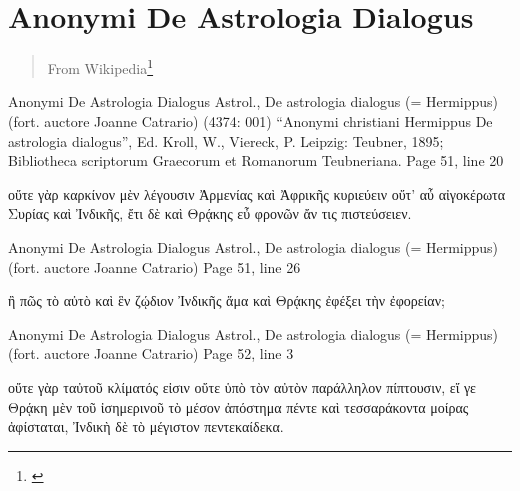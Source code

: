 \documentclass[12pt,letterpaper,twoside,final]{memoir}
\begin{document}
\section{Anonymi De Astrologia Dialogus}%
\blockquote[From Wikipedia\footnote{\url{}}]{}
\begin{greek}

Anonymi De Astrologia Dialogus Astrol., De astrologia dialogus (= Hermippus) (fort. auctore Joanne Catrario) (4374: 001)
“Anonymi christiani Hermippus De astrologia dialogus”, Ed. Kroll, W., Viereck, P.
Leipzig: Teubner, 1895; Bibliotheca scriptorum Graecorum et Romanorum Teubneriana.
Page 51, line 20

                                   οὔτε γὰρ καρκίνον μὲν 
λέγουσιν Ἀρμενίας καὶ Ἀφρικῆς κυριεύειν οὔτ' αὖ 
αἰγοκέρωτα Συρίας καὶ Ἰνδικῆς, ἔτι δὲ καὶ Θρᾴκης 
εὖ φρονῶν ἄν τις πιστεύσειεν. 



Anonymi De Astrologia Dialogus Astrol., De astrologia dialogus (= Hermippus) (fort. auctore Joanne Catrario) 
Page 51, line 26

                                                       ἢ πῶς 
τὸ αὐτὸ καὶ ἓν ζῴδιον Ἰνδικῆς ἅμα καὶ Θρᾴκης ἐφέξει 
τὴν ἐφορείαν; 



Anonymi De Astrologia Dialogus Astrol., De astrologia dialogus (= Hermippus) (fort. auctore Joanne Catrario) 
Page 52, line 3

                 οὔτε γὰρ ταὐτοῦ κλίματός εἰσιν οὔτε   
ὑπὸ τὸν αὐτὸν παράλληλον πίπτουσιν, εἴ γε Θρᾴκη 
μὲν τοῦ ἰσημερινοῦ τὸ μέσον ἀπόστημα πέντε καὶ 
τεσσαράκοντα μοίρας ἀφίσταται, Ἰνδικὴ δὲ τὸ μέγιστον 
πεντεκαίδεκα. 

\end{greek}
\end{document}
